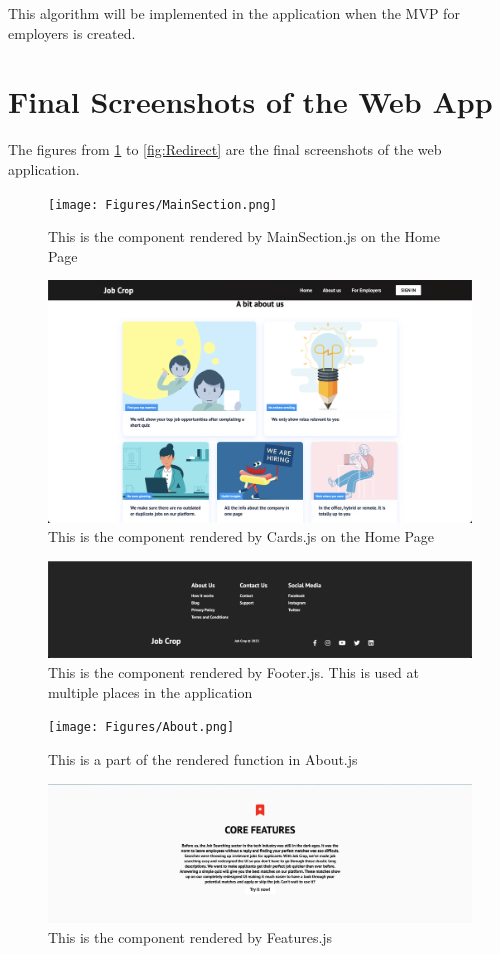 This algorithm will be implemented in the application when the MVP for employers is created.
\section{Final Screenshots of the Web App}
The figures from \ref{fig:MainSection} to \ref{fig:Redirect} are the final screenshots of the web application.
\begin{figure}
    \centering
    \texttt{[image: Figures/MainSection.png]}
    \caption{This is the component rendered by MainSection.js on the Home Page}
    \label{fig:MainSection}
\end{figure}
\begin{figure}
    \centering
    \includegraphics[width = 140mm]{Figures/Cards.png}
    \caption{This is the component rendered by Cards.js on the Home Page}
    \label{fig:Cards}
\end{figure}
\begin{figure}
    \centering
    \includegraphics[width = 140mm]{Figures/Footer.png}
    \caption{This is the component rendered by Footer.js. This is used at multiple places in the application}
    \label{fig:Footer}
\end{figure}
\begin{figure}
    \centering
    \texttt{[image: Figures/About.png]}
    \caption{This is a part of the rendered function in About.js}
    \label{fig:About}
\end{figure}
\begin{figure}
    \centering
    \includegraphics[width = 140mm]{Figures/Features.png}
    \caption{This is the component rendered by Features.js}
    \label{fig:Features}
\end{figure}
